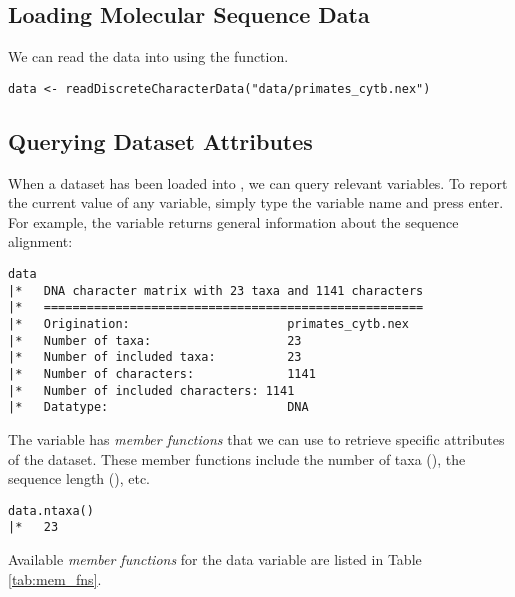 \subsection{Loading Molecular Sequence Data}
We can read the data into \RevBayes  using the  function. 
{\tt \begin{snugshade*}
\begin{lstlisting}
data <- readDiscreteCharacterData("data/primates_cytb.nex")
\end{lstlisting}
\end{snugshade*}}

\subsection{Querying Dataset Attributes}
When a dataset has been loaded into \RevBayes, we can query relevant \Rev variables. 
To report the current value of any variable, simply type the variable name and press enter. 
For example, the  variable returns general information about the sequence alignment:
{\tt \begin{snugshade*}
\begin{lstlisting}
data
|*   DNA character matrix with 23 taxa and 1141 characters
|*   =====================================================
|*   Origination:                      primates_cytb.nex
|*   Number of taxa:                   23
|*   Number of included taxa:          23
|*   Number of characters:             1141
|*   Number of included characters: 1141
|*   Datatype:                         DNA
\end{lstlisting}
\end{snugshade*}}

The  variable has \textit{member functions} that we can use to retrieve specific attributes of the dataset. 
These member functions include the number of taxa (), the sequence length (), etc.
{\tt \begin{snugshade*}
\begin{lstlisting}
data.ntaxa()
|*   23
\end{lstlisting}
\end{snugshade*}}

Available \textit{member functions} for the data variable are listed in Table \ref{tab:mem_fns}.



